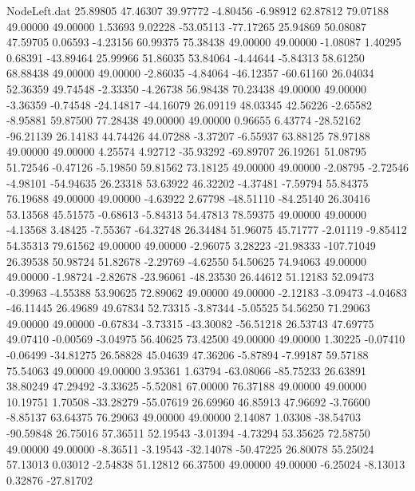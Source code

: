 \begin{filecontents}{NodeLeft.dat}
  25.89805   47.46307   39.97772    -4.80456   -6.98912   62.87812   79.07188   49.00000   49.00000    1.53693    9.02228  -53.05113  -77.17265
  25.94869   50.08087   47.59705     0.06593   -4.23156   60.99375   75.38438   49.00000   49.00000   -1.08087    1.40295    0.68391  -43.89464
  25.99966   51.86035   53.84064    -4.44644   -5.84313   58.61250   68.88438   49.00000   49.00000   -2.86035   -4.84064  -46.12357  -60.61160
  26.04034   52.36359   49.74548    -2.33350   -4.26738   56.98438   70.23438   49.00000   49.00000   -3.36359   -0.74548  -24.14817  -44.16079
  26.09119   48.03345   42.56226    -2.65582   -8.95881   59.87500   77.28438   49.00000   49.00000    0.96655    6.43774  -28.52162  -96.21139
  26.14183   44.74426   44.07288    -3.37207   -6.55937   63.88125   78.97188   49.00000   49.00000    4.25574    4.92712  -35.93292  -69.89707
  26.19261   51.08795   51.72546    -0.47126   -5.19850   59.81562   73.18125   49.00000   49.00000   -2.08795   -2.72546   -4.98101  -54.94635
  26.23318   53.63922   46.32202    -4.37481   -7.59794   55.84375   76.19688   49.00000   49.00000   -4.63922    2.67798  -48.51110  -84.25140
  26.30416   53.13568   45.51575    -0.68613   -5.84313   54.47813   78.59375   49.00000   49.00000   -4.13568    3.48425   -7.55367  -64.32748
  26.34484   51.96075   45.71777    -2.01119   -9.85412   54.35313   79.61562   49.00000   49.00000   -2.96075    3.28223  -21.98333 -107.71049
  26.39538   50.98724   51.82678    -2.29769   -4.62550   54.50625   74.94063   49.00000   49.00000   -1.98724   -2.82678  -23.96061  -48.23530
  26.44612   51.12183   52.09473    -0.39963   -4.55388   53.90625   72.89062   49.00000   49.00000   -2.12183   -3.09473   -4.04683  -46.11445
  26.49689   49.67834   52.73315    -3.87344   -5.05525   54.56250   71.29063   49.00000   49.00000   -0.67834   -3.73315  -43.30082  -56.51218
  26.53743   47.69775   49.07410    -0.00569   -3.04975   56.40625   73.42500   49.00000   49.00000    1.30225   -0.07410   -0.06499  -34.81275
  26.58828   45.04639   47.36206    -5.87894   -7.99187   59.57188   75.54063   49.00000   49.00000    3.95361    1.63794  -63.08066  -85.75233
  26.63891   38.80249   47.29492    -3.33625   -5.52081   67.00000   76.37188   49.00000   49.00000   10.19751    1.70508  -33.28279  -55.07619
  26.69960   46.85913   47.96692    -3.76600   -8.85137   63.64375   76.29063   49.00000   49.00000    2.14087    1.03308  -38.54703  -90.59848
  26.75016   57.36511   52.19543    -3.01394   -4.73294   53.35625   72.58750   49.00000   49.00000   -8.36511   -3.19543  -32.14078  -50.47225
  26.80078   55.25024   57.13013     0.03012   -2.54838   51.12812   66.37500   49.00000   49.00000   -6.25024   -8.13013    0.32876  -27.81702

\end{filecontents}

